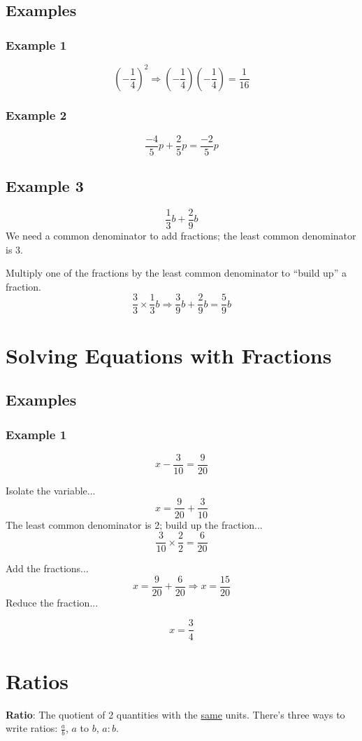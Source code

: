 \documentclass[letterpaper, 10pt]{article}
\begin{document}
\subsection{Examples}
\subsubsection{Example 1}
	$$
	\left(-\frac{1}{4}\right)^2 \Rightarrow 
	\left(-\frac{1}{4}\right) \left(-\frac{1}{4}\right) 
	= \frac{1}{16}
	$$
\subsubsection{Example 2}
	$$
	\frac{-4}{5}p + \frac{2}{5}p = \frac{-2}{5}p
	$$

\subsection{Example 3}
	$$
	\frac{1}{3}b + \frac{2}{9}b
	$$
	We need a common denominator to add fractions; the least common denominator is 3.

	Multiply one of the fractions by the least common denominator to ``build up'' a fraction.
	$$
	\frac{3}{3} \times \frac{1}{3}b \Rightarrow \frac{3}{9}b + \frac{2}{9}b = \frac{5}{9}b
	$$

\section{Solving Equations with Fractions}
\subsection{Examples}
\subsubsection{Example 1}
	$$
	x - \frac{3}{10} = \frac{9}{20}
	$$

	Isolate the variable...
	$$
	x = \frac{9}{20} + \frac{3}{10}
	$$
	The least common denominator is 2; build up the fraction...
	$$
	\frac{3}{10} \times \frac{2}{2} = \frac{6}{20}	
	$$

	Add the fractions...
	$$
	x = \frac{9}{20} + \frac{6}{20} \Rightarrow x = \frac{15}{20}
	$$
	Reduce the fraction...	

	$$
	x = \frac{3}{4}
	$$

\section{Ratios}
\noindent \textbf{Ratio}: The quotient of 2 quantities with the \underline{same} units.
There's three ways to write ratios: $\frac{a}{b}$, $a$ to $b$, $a : b$.
\end{document}
